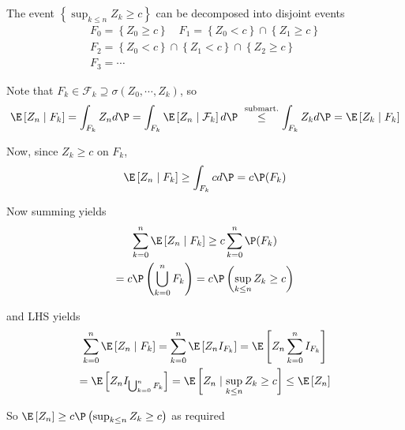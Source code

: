 \begin{prf}[]{}
  The event $\left\{\sup_{k\leq n}Z_k\geq c\right\}$ can be decomposed into disjoint events
  \begin{equation*}
    \begin{gathered}
    F_0=\left\{Z_0\geq c\right\}\quad F_1 = \left\{Z_0<c\right\}\cap\left\{Z_1\geq c\right\}\\
  F_2 = \left\{Z_0<c\right\}\cap\left\{Z_1<c\right\}\cap \left\{Z_2\geq c\right\}\\
  F_3 = \cdots
    \end{gathered}
  \end{equation*}\par
  \noindent Note that $F_k\in\mathcal{F}_k\supseteq \sigma(Z_0,\cdots,Z_k)$, so 
  \begin{equation*}
    \begin{gathered}
      \E\left[Z_n\mid F_k\right] = \int_{F_k}Z_nd\P=\int_{F_k}\E\left[Z_n\mid\mathcal{F}_k\right]d\P\
      \stackrel{\text{submart.}}{\leq}\int_{F_k}Z_kd\P = \E\left[Z_k\mid F_k\right]
    \end{gathered}
  \end{equation*}
  \par\bigskip
  \noindent Now, since $Z_k\geq c$ on $F_k$,
  \begin{equation*}
    \begin{gathered}
      \E\left[Z_n\mid F_k\right]\geq \int_{F_k}cd\P = c\P(F_k)
    \end{gathered}
  \end{equation*}\par
  \noindent Now summing yields
  \begin{equation*}
    \begin{gathered}
      \sum_{k=0}^{n}\E\left[Z_n\mid F_k\right]\geq c\sum_{k=0}^{n}\P(F_k)\\
      =c\P\left(\bigcup_{k=0}^{n}F_k\right) = c\P\left(\sup_{k\leq n}Z_k\geq c\right)
    \end{gathered}
  \end{equation*}\par
  \noindent and LHS yields
  \begin{equation*}
    \begin{gathered}
      \sum_{k=0}^{n}\E\left[Z_n\mid F_k\right] = \sum_{k=0}^{n}\E\left[Z_nI_{F_k}\right] = \E\left[Z_n\sum_{k=0}^{n}I_{F_k}\right]\\
      =\E\left[Z_nI_{\bigcup_{k=0}^{n}F_k}\right] = \E\left[Z_n\mid\sup_{k\leq n}Z_k\geq c\right]\leq\E\left[Z_n\right]
    \end{gathered}
  \end{equation*}
  \par\bigskip
  \noindent So $\E\left[Z_n\right]\geq c\P\left(\sup_{k\leq n}Z_k\geq c\right)$ as required
\end{prf}
